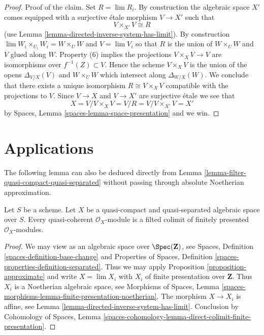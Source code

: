 \begin{proof}
\medskip\noindent
Proof of the claim. Set $R = \lim R_i$.
By construction the algebraic space $X'$ comes
equipped with a surjective \'etale morphism $V \to X'$ such that
$$
V \times_{X'} V \cong R
$$
(use Lemma \ref{lemma-directed-inverse-system-has-limit}).
By construction $\lim W_i \times_{U_i} W_i = W \times_U W$ and $V = \lim V_i$
so that $R$ is the union of $W \times_U W$ and $V$ glued along $W$.
Property (6) implies the projections $V \times_X V \to V$ are isomorphisms
over $f^{-1}(Z) \subset V$. Hence the scheme $V \times_X V$ is the union
of the opens $\Delta_{V/X}(V)$ and $W \times_U W$ which intersect
along $\Delta_{W/X}(W)$. We conclude that there exists a unique isomorphism
$R \cong V \times_X V$ compatible with the projections to $V$.
Since $V \to X$ and $V \to X'$ are surjective \'etale we see that
$$
X = V/ V \times_X V = V/R = V/V \times_{X'} V = X'
$$
by Spaces, Lemma \ref{spaces-lemma-space-presentation} and we win.
\end{proof}




\section{Applications}
\label{section-applications}

\noindent
The following lemma can also be deduced directly from
Lemma \ref{lemma-filter-quasi-compact-quasi-separated}
without passing through absolute Noetherian approximation.

\begin{lemma}
\label{lemma-colimit-finitely-presented}
Let $S$ be a scheme. Let $X$ be a quasi-compact and quasi-separated algebraic
space over $S$. Every quasi-coherent $\mathcal{O}_X$-module is a
filted colimit of finitely presented $\mathcal{O}_X$-modules.
\end{lemma}

\begin{proof}
We may view as an algebraic space over $\Spec(\mathbf{Z})$, see
Spaces, Definition \ref{spaces-definition-base-change} and
Properties of Spaces, Definition \ref{spaces-properties-definition-separated}.
Thus we may apply Proposition \ref{proposition-approximate}
and write $X = \lim X_i$ with $X_i$ of finite presentation over $\mathbf{Z}$.
Thus $X_i$ is a Noetherian algebraic space, see
Morphisms of Spaces, Lemma
\ref{spaces-morphisms-lemma-finite-presentation-noetherian}.
The morphism $X \to X_i$ is affine, see
Lemma \ref{lemma-directed-inverse-system-has-limit}.
Conclusion by
Cohomology of Spaces, Lemma
\ref{spaces-cohomology-lemma-direct-colimit-finite-presentation}.
\end{proof}

